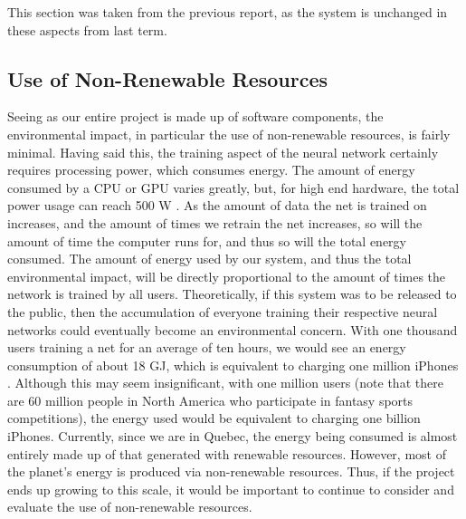 This section was taken from the previous report, as the system is unchanged in these aspects from last term.

\subsection{Use of Non-Renewable Resources}
Seeing as our entire project is made up of software components, the environmental impact, in particular the use of non-renewable resources, is fairly minimal. Having said this, the training aspect of the neural network certainly requires processing power, which consumes energy. The amount of energy consumed by a CPU or GPU varies greatly, but, for high end hardware, the total power usage can reach 500 W \cite{GPU}. As the amount of data the net is trained on increases, and the amount of times we retrain the net increases, so will the amount of time the computer runs for, and thus so will the total energy consumed. The amount of energy used by our system, and thus the total environmental impact, will be directly proportional to the amount of times the network is trained by all users. Theoretically, if this system was to be released to the public, then the accumulation of everyone training their respective neural networks could eventually become an environmental concern. With one thousand users training a net for an average of ten hours, we would see an energy consumption of about 18 GJ, which is equivalent to charging one million iPhones \cite{iphone}. Although this may seem insignificant, with one million users (note that there are 60 million people in North America who participate in fantasy sports competitions), \cite{fantasyQuantity} the energy used would be equivalent to charging one billion iPhones. Currently, since we are in Quebec, the energy being consumed is almost entirely made up of that generated with renewable resources. However, most of the planet's energy is produced via non-renewable resources\cite{energy}. Thus, if the project ends up growing to this scale, it would be important to continue to consider and evaluate the use of non-renewable resources.


